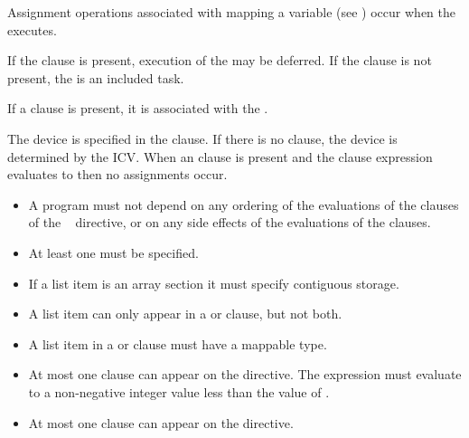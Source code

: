 Assignment operations associated with mapping a variable (see ) occur when the  executes.

If the  clause is present, execution of the  may be deferred.  If the  clause is not present, the  is an included task.

If a  clause is present, it is associated with the .

The device is specified in the  clause. If there is no  clause, the device 
is determined by the  ICV. When an  clause is present and the  
clause expression evaluates to  then no assignments occur.

{}

\restrictions
\begin{itemize}
\item A program must not depend on any ordering of the evaluations of the clauses of the 
~ directive, or on any side effects of the evaluations of the clauses. 

\item At least one  must be specified.

\item If a list item is an array section it must specify contiguous storage. 

\item A list item can only appear in a  or  clause, but not both.

\item A list item in a  or  clause must have a mappable type.

\item At most one  clause can appear on the directive. The  expression
      must evaluate to a non-negative integer value less than the value
      of .

\item At most one  clause can appear on the directive. 
\end{itemize}

